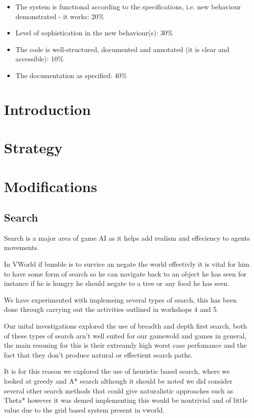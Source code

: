 \documentclass[a4paper,oneside]{report}
\begin{document}
\begin{itemize}
\item The system is functional according to the specifications, i.e. new behaviour demonstrated - it works: 20\%
\item Level of sophistication in the new behaviour(s): 30\%
\item The code is well-structured, documented and annotated (it is clear and accessible): 10\%
\item The documentation as specified: 40\%
\end{itemize}





\section{Introduction}

\section{Strategy}

\section{Modifications}

	\subsection{Search}
	
		Search is a major area of game AI as it helps add realism and effeciency to agents movements.

In VWorld if bumble is to survice an negate the world effectivly it is vital for him to have some form of search so he can navigate back to an object he has seen for instance if he is hungry he should negate to a tree or any food he has seen. 

We have experimented with implemeing several types of search, this has been done through carrying out the activities outlined in workshops 4 and 5. 

Our inital investigations explored the use of breadth and depth first search, both of these types of search arn't well suited for our gamewold and games in general, the main resoning for this is their extreamly high worst case perfomance and the fact that they don't produce natural  or effectient search paths. 

It is for this reason we explored the use of heuristic based search, where we looked at greedy and A* search although it should be noted we did consider several other search methods that could give naturalistic approaches such as Theta* however it was demed implementing this would be nontrivial and of little value due to the grid based system present in vworld. 
\end{document}
